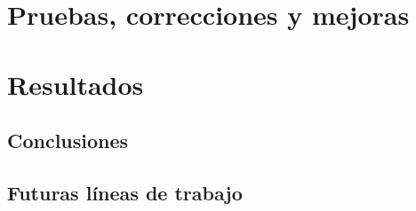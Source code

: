 \cleardoublepage



\chapter{Pruebas, correcciones y mejoras}

\cleardoublepage



\chapter{Resultados}

    \section{Conclusiones}


    \section{Futuras líneas de trabajo}


\cleardoublepage
